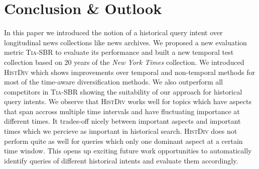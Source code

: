 
\section{Conclusion \& Outlook}
\vspace{-2mm}
In this paper we introduced the notion of a historical query intent over longitudinal news collections like news archives. We proposed a new evaluation metric \textsc{Tia-SBR} to evaluate its performance and built a new temporal test collection based on 20 years of the \emph{New York Times} collection. We introduced \textsc{HistDiv} which shows improvements over temporal and non-temporal methods for most of the time-aware diversification methods. We also outperform all competitors in \textsc{Tia-SBR} showing the suitability of our approach for historical query intents. We observe that \textsc{HistDiv} works well for topics which have aspects that span accross multiple time intervals and have fluctuating importance at different times. It trades-off nicely between important aspects and important times which we percieve as important in historical search. \textsc{HistDiv} does not perform quite as well for queries which only one dominant aspect at a certain time window. This opens up exciting future work opportunities to automatically identify queries of different historical intents and evaluate them accordingly.





